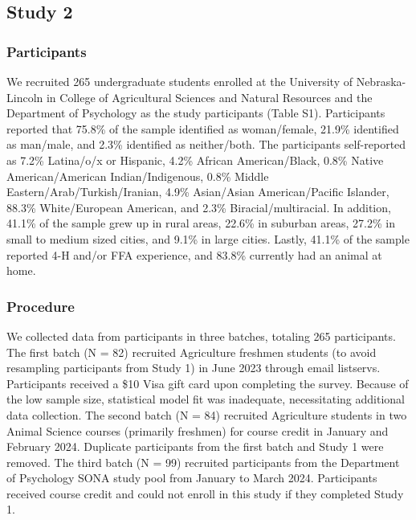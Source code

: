 \documentclass[
  jou,
  longtable,
  nolmodern,
  notxfonts,
  notimes,
  colorlinks=true,linkcolor=blue,citecolor=blue,urlcolor=blue]{apa7}
\begin{document}
\subsection{Study 2}\label{study-2}

\subsubsection{Participants}\label{participants-1}

We recruited 265 undergraduate students enrolled at the University of
Nebraska-Lincoln in College of Agricultural Sciences and Natural
Resources and the Department of Psychology as the study participants
(Table S1). Participants reported that 75.8\% of the sample identified
as woman/female, 21.9\% identified as man/male, and 2.3\% identified as
neither/both. The participants self-reported as 7.2\% Latina/o/x or
Hispanic, 4.2\% African American/Black, 0.8\% Native American/American
Indian/Indigenous, 0.8\% Middle Eastern/Arab/Turkish/Iranian, 4.9\%
Asian/Asian American/Pacific Islander, 88.3\% White/European American,
and 2.3\% Biracial/multiracial. In addition, 41.1\% of the sample grew
up in rural areas, 22.6\% in suburban areas, 27.2\% in small to medium
sized cities, and 9.1\% in large cities. Lastly, 41.1\% of the sample
reported 4-H and/or FFA experience, and 83.8\% currently had an animal
at home.

\subsubsection{Procedure}\label{procedure-1}

We collected data from participants in three batches, totaling 265
participants. The first batch (N = 82) recruited Agriculture freshmen
students (to avoid resampling participants from Study 1) in June 2023
through email listservs. Participants received a \$10 Visa gift card
upon completing the survey. Because of the low sample size, statistical
model fit was inadequate, necessitating additional data collection. The
second batch (N = 84) recruited Agriculture students in two Animal
Science courses (primarily freshmen) for course credit in January and
February 2024. Duplicate participants from the first batch and Study 1
were removed. The third batch (N = 99) recruited participants from the
Department of Psychology SONA study pool from January to March 2024.
Participants received course credit and could not enroll in this study
if they completed Study 1.
\end{document}
